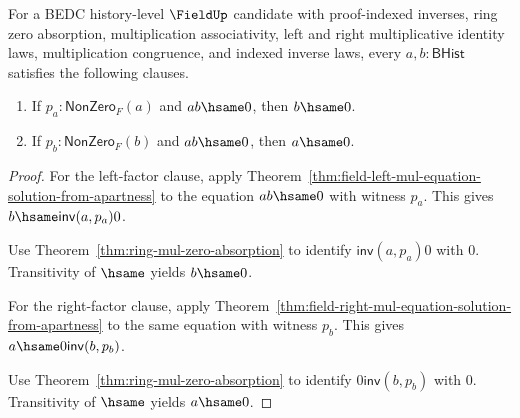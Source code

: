 \begin{theorem}
\label{thm:field-one-sided-zero-product-cancel-from-apartness}
For a BEDC history-level $\FieldUp$ candidate with proof-indexed inverses,
ring zero absorption, multiplication associativity, left and right
multiplicative identity laws, multiplication congruence, and indexed inverse
laws, every $a,b:\mathsf{BHist}$ satisfies the following clauses.
\begin{enumerate}
\item If $p_a:\mathsf{NonZero}_F(a)$ and $a b\hsame0$, then $b\hsame0$.
\item If $p_b:\mathsf{NonZero}_F(b)$ and $a b\hsame0$, then $a\hsame0$.
\end{enumerate}
\end{theorem}
\begin{proof}
For the left-factor clause, apply
Theorem~\ref{thm:field-left-mul-equation-solution-from-apartness} to the
equation $a b\hsame0$ with witness $p_a$. This gives
$b\hsame\mathsf{inv}(a,p_a)0$.

Use Theorem~\ref{thm:ring-mul-zero-absorption} to identify
$\mathsf{inv}(a,p_a)0$ with $0$. Transitivity of $\hsame$ yields
$b\hsame0$.

For the right-factor clause, apply
Theorem~\ref{thm:field-right-mul-equation-solution-from-apartness} to the
same equation with witness $p_b$. This gives
$a\hsame0\mathsf{inv}(b,p_b)$.

Use Theorem~\ref{thm:ring-mul-zero-absorption} to identify
$0\mathsf{inv}(b,p_b)$ with $0$. Transitivity of $\hsame$ yields
$a\hsame0$.
\end{proof}


